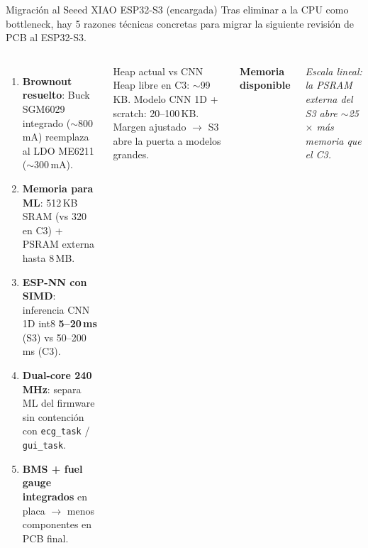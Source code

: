 \documentclass[aspectratio=169, 10pt]{beamer}
\begin{document}
\begin{frame}{Migraci\'on al Seeed XIAO ESP32-S3 (encargada)}
    \scriptsize
    Tras eliminar a la CPU como bottleneck, hay 5 razones t\'ecnicas concretas para migrar la siguiente revisi\'on de PCB al ESP32-S3.
    \vspace{0.15cm}
    \begin{columns}[T]
        \scriptsize
        \begin{enumerate}\itemsep0.05cm
            \item \alert{\textbf{Brownout resuelto}}: Buck SGM6029 integrado ($\sim$800\,mA) reemplaza al LDO ME6211 ($\sim$300\,mA).
            \item \textbf{Memoria para ML}: 512\,KB SRAM (vs 320 en C3) + PSRAM externa hasta 8\,MB.
            \item \textbf{ESP-NN con SIMD}: inferencia CNN 1D int8 \textbf{5--20\,ms} (S3) vs 50--200\,ms (C3).
            \item \textbf{Dual-core 240\,MHz}: separa ML del firmware sin contenci\'on con \texttt{ecg\_task} / \texttt{gui\_task}.
            \item \textbf{BMS + fuel gauge integrados} en placa $\to$ menos componentes en PCB final.
        \end{enumerate}
        \vspace{0.15cm}
        \begin{block}{Heap actual vs CNN}
            \scriptsize Heap libre en C3: $\sim$99\,KB. Modelo CNN 1D + scratch: 20--100\,KB. Margen ajustado $\to$ S3 abre la puerta a modelos grandes.
        \end{block}
        \scriptsize
        \textbf{Memoria disponible}
        \vspace{0.05cm}

        \vspace{0.1cm}

        \scriptsize \textit{Escala lineal: la PSRAM externa del S3 abre $\sim$25$\times$ m\'as memoria que el C3.}
    \end{columns}
\end{frame}
\end{document}
